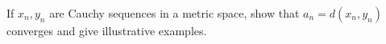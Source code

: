 If $x_n,y_n$ are Cauchy sequences in a metric space, show that $a_n=d(x_n,y_n)$ converges and give
illustrative examples.\\